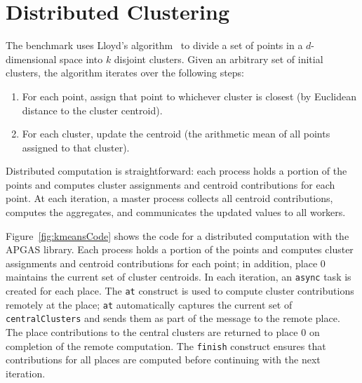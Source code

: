 \section{Distributed \kmeans Clustering}
\label{sec:kmeans}

The \kmeans benchmark uses Lloyd's algorithm~\cite{Lloyd1982Least} to divide a
set of points in a $d$-dimensional space into $k$ disjoint clusters.  Given an
arbitrary set of initial clusters, the algorithm iterates over the following
steps:
\begin{enumerate}
  \item For each point, assign that point to whichever cluster is closest (by
Euclidean distance to the cluster centroid).
  \item For each cluster, update the centroid (the arithmetic mean of all
points assigned to that cluster).
\end{enumerate}
Distributed computation is straightforward: each process holds a portion of the
points and computes cluster assignments and centroid contributions for each
point. At each iteration, a master process collects all centroid contributions,
computes the aggregates, and communicates the updated values to all workers.

% 
 
Figure~\ref{fig:kmeansCode} shows the code for a distributed \kmeans computation with the APGAS library.
Each process holds a portion of the points and computes cluster assignments and centroid contributions for each point; in addition, place 0 maintains the current set of cluster centroids.
In each iteration, an \lstinline{async} task is created for each place.
The \lstinline{at} construct is used to compute cluster contributions remotely at the place; \lstinline{at} automatically captures the current set of \lstinline{centralClusters} and sends them as part of the message to the remote place.
The place contributions to the central clusters are returned to place 0 on completion of the remote computation.
The \lstinline{finish} construct ensures that contributions for all places are computed before continuing with the next iteration.

